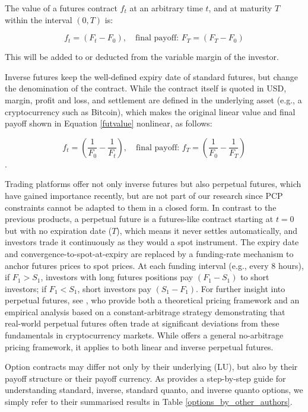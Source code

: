 \documentclass[12pt]{article}
\begin{document}
The value of a futures contract $f_t$ at an arbitrary time $t$, and at maturity $T$ within the interval $(0, T)$ is:

    \begin{equation}\label{futvalue}
    f_t = (F_t - F_0), \quad \text{final payoff: } F_T = (F_T - F_0)
    \end{equation}

This will be added to or deducted from the variable margin of the investor.

Inverse futures keep the well-defined expiry date of standard futures, but change the denomination of the contract. While the contract itself is quoted in USD, margin, profit and loss, and settlement are defined in the underlying asset (e.g., a cryptocurrency such as Bitcoin), which makes the original linear value and final payoff shown in Equation \ref{futvalue} nonlinear, as follows:


    \begin{equation}\label{invfutvalue}
    f_t = \left(\frac{1}{F_0} - \frac{1}{F_t}\right), \quad
    \text{final payoff: } f_T=\left(\frac{1}{F_0} - \frac{1}{F_T}\right)
    \end{equation}.

Trading platforms offer not only inverse futures but also perpetual futures, which have gained importance recently, but are not part of our research since PCP constraints cannot be adapted to them in a closed form. In contrast to the previous products, a perpetual future is a futures-like contract starting at $t=0$ but with no expiration date ($T$), which means it never settles automatically, and investors trade it continuously as they would a spot instrument. The expiry date and convergence-to-spot-at-expiry are replaced by a funding-rate mechanism to anchor futures prices to spot prices. At each funding interval (e.g., every 8 hours), if $F_1>S_1$, investors with long futures positions pay $(F_1-S_1)$ to short investors; if $F_1<S_1$, short investors pay $(S_1-F_1)$. For further insight into perpetual futures, see \cite{he2022fundamentals}, who provide both a theoretical pricing framework and an empirical analysis based on a constant-arbitrage strategy demonstrating that real-world perpetual futures often trade at significant deviations from these fundamentals in cryptocurrency markets. While \cite{ackerer2025perpetual} offers a general no-arbitrage pricing framework, it applies to both linear and inverse perpetual futures.

Option contracts may differ not only by their underlying (LU), but also by their payoff structure or their payoff currency. As \cite{alexander2023crypto} provides a step-by-step guide for understanding standard, inverse, standard quanto, and inverse quanto options, we simply refer to their summarised results in Table \ref{options_by_other_authors}.
\end{document}
